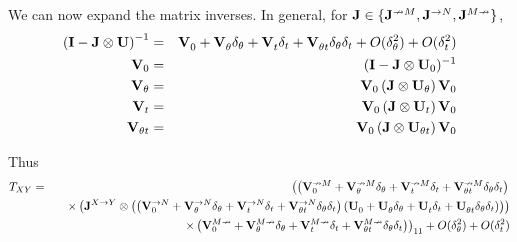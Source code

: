 \documentclass{article}
\begin{document}
We can now expand the matrix inverses.
In general, for ${\bf J} \in \{ {\bf J}^{\nrightarrow M}, {\bf J}^{\rightarrow N}, {\bf J}^{M \nrightarrow} \}$,
\begin{eqnarray*}
  \left( {\bf I} - {\bf J} \otimes {\bf U} \right)^{-1}
  & = & \vexpansion{} + O(\delta_\theta^2) + O(\delta_t^2) \\
{\bf V}_0 & = & ({\bf I} - {\bf J} \otimes {\bf U}_0)^{-1} \\
{\bf V}_\theta & = & {\bf V}_0 \left( {\bf J} \otimes {\bf U}_\theta \right) {\bf V}_0 \\
{\bf V}_t & = & {\bf V}_0 \left( {\bf J} \otimes {\bf U}_t \right) {\bf V}_0 \\
{\bf V}_{\theta t} & = & {\bf V}_0 \left( {\bf J} \otimes {\bf U}_{\theta t} \right) {\bf V}_0
\end{eqnarray*}

Thus
\begin{eqnarray*}
T_{XY} & = &
\left(
\left( \vexpansion{\nrightarrow M} \right)
\right. \\ & & \quad \times
\left(
     {\bf J}^{X \to Y} \otimes
     \left( \left( \vexpansion{\rightarrow N} \right)
     \left( \uexpansion \right) \right)
\right)
 \\ & & \quad \left. \times
 \left( \vexpansion{M \nrightarrow} \right)
\right)_{11}  + O(\delta_\theta^2) + O(\delta_t^2)
\end{eqnarray*}
\end{document}
